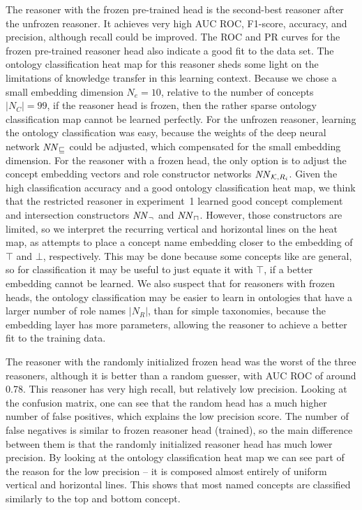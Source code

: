The reasoner with the frozen pre-trained head is the second-best reasoner after the unfrozen reasoner.
It achieves very high AUC ROC, F1-score, accuracy, and precision, although recall could be improved. 
The ROC and PR curves for the frozen pre-trained reasoner head also indicate a good fit to the data set.
The ontology classification heat map for this reasoner sheds some light on the limitations of knowledge transfer in this learning context. 
Because we chose a small embedding dimension $N_e = 10$, relative to the number of concepts $|N_C| = 99$, if the reasoner head is frozen, then the rather sparse ontology classification map cannot be learned perfectly.
For the unfrozen reasoner, learning the ontology classification was easy, because the weights of the deep neural network $\mathit{NN}_\sqsubseteq$ could be adjusted, which compensated for the small embedding dimension. 
For the reasoner with a frozen head, the only option is to adjust the concept embedding vectors and role constructor networks $\mathit{NN}_{\mathcal{K},R_i}$.
Given the high classification accuracy and a good ontology classification heat map, we think that the restricted reasoner in experiment~1 learned good concept complement and intersection constructors $\mathit{NN}_\lnot$ and $\mathit{NN}_\sqcap$.
However, those constructors are limited, so we interpret the recurring vertical and horizontal lines on the heat map, as attempts to place a concept name embedding closer to the embedding of $\top$ and $\bot$, respectively.
This may be done because some concepts like  are general, so for classification it may be useful to just equate it with $\top$, if a better embedding cannot be learned.
We also suspect that for reasoners with frozen heads, the ontology classification may be easier to learn in ontologies that have a larger number of role names $|N_R|$, than for simple taxonomies, because the embedding layer has more parameters, allowing the reasoner to achieve a better fit to the training data.

The reasoner with the randomly initialized frozen head was the worst of the three reasoners, although it is better than a random guesser, with AUC ROC of around 0.78.
This reasoner has very high recall, but relatively low precision.
Looking at the confusion matrix, one can see that the random head has a much higher number of false positives, which explains the low precision score.
The number of false negatives is similar to frozen reasoner head (trained), so the main difference between them is that the randomly initialized reasoner head has much lower precision.
By looking at the ontology classification heat map we can see part of the reason for the low precision -- it is composed almost entirely of uniform vertical and horizontal lines. 
This shows that most named concepts are classified similarly to the top and bottom concept.


